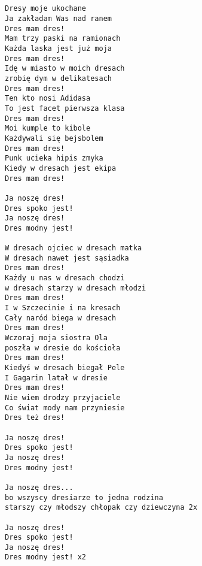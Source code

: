\documentclass[12pt]{article}
\begin{document}
\subsection*{}
\begin{verbatim}
Dresy moje ukochane
Ja zakładam Was nad ranem
Dres mam dres!
Mam trzy paski na ramionach
Każda laska jest już moja
Dres mam dres!
Idę w miasto w moich dresach
zrobię dym w delikatesach
Dres mam dres!
Ten kto nosi Adidasa
To jest facet pierwsza klasa
Dres mam dres!
Moi kumple to kibole
Każdywali się bejsbolem
Dres mam dres!
Punk ucieka hipis zmyka
Kiedy w dresach jest ekipa
Dres mam dres!

Ja noszę dres!
Dres spoko jest!
Ja noszę dres!
Dres modny jest!

W dresach ojciec w dresach matka
W dresach nawet jest sąsiadka
Dres mam dres!
Każdy u nas w dresach chodzi
w dresach starzy w dresach młodzi
Dres mam dres!
I w Szczecinie i na kresach
Cały naród biega w dresach
Dres mam dres!
Wczoraj moja siostra Ola
poszła w dresie do kościoła
Dres mam dres!
Kiedyś w dresach biegał Pele
I Gagarin latał w dresie
Dres mam dres!
Nie wiem drodzy przyjaciele
Co świat mody nam przyniesie
Dres też dres!

Ja noszę dres!
Dres spoko jest!
Ja noszę dres!
Dres modny jest!

Ja noszę dres...
bo wszyscy dresiarze to jedna rodzina
starszy czy młodszy chłopak czy dziewczyna 2x

Ja noszę dres!
Dres spoko jest!
Ja noszę dres!
Dres modny jest! x2
\end{verbatim}
\clearpage
\end{document}
